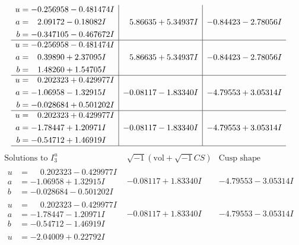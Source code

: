 \documentclass[1p]{elsarticle_modified}
\theoremstyle{definition}
\newcommand{\I}{\sqrt{-1}}
\begin{document}
$$\begin{array}{c|c|c}
\begin{aligned}
u &= -0.256958 - 0.481474 I \\
a &= \phantom{-}2.09172 - 0.18082 I \\
b &= -0.347105 - 0.467672 I\end{aligned}
 & \phantom{-}5.86635 + 5.34937 I & -0.84423 - 2.78056 I \\ \hline\begin{aligned}
u &= -0.256958 - 0.481474 I \\
a &= \phantom{-}0.39890 + 2.37095 I \\
b &= \phantom{-}1.48260 + 1.54705 I\end{aligned}
 & \phantom{-}5.86635 + 5.34937 I & -0.84423 - 2.78056 I \\ \hline\begin{aligned}
u &= \phantom{-}0.202323 + 0.429977 I \\
a &= -1.06958 - 1.32915 I \\
b &= -0.028684 + 0.501202 I\end{aligned}
 & -0.08117 - 1.83340 I & -4.79553 + 3.05314 I \\ \hline\begin{aligned}
u &= \phantom{-}0.202323 + 0.429977 I \\
a &= -1.78447 + 1.20971 I \\
b &= -0.54712 + 1.46919 I\end{aligned}
 & -0.08117 - 1.83340 I & -4.79553 + 3.05314 I\\
 \hline 
 \end{array}$$\newpage$$\begin{array}{c|c|c}  
\text{Solutions to }I^u_{3}& \I (\text{vol} + \sqrt{-1}CS) & \text{Cusp shape}\\
 \hline 
\begin{aligned}
u &= \phantom{-}0.202323 - 0.429977 I \\
a &= -1.06958 + 1.32915 I \\
b &= -0.028684 - 0.501202 I\end{aligned}
 & -0.08117 + 1.83340 I & -4.79553 - 3.05314 I \\ \hline\begin{aligned}
u &= \phantom{-}0.202323 - 0.429977 I \\
a &= -1.78447 - 1.20971 I \\
b &= -0.54712 - 1.46919 I\end{aligned}
 & -0.08117 + 1.83340 I & -4.79553 - 3.05314 I \\ \hline\begin{aligned}
u &= -2.04009 + 0.22792 I \\

\end{aligned}
\end{array}$$
\end{document}
